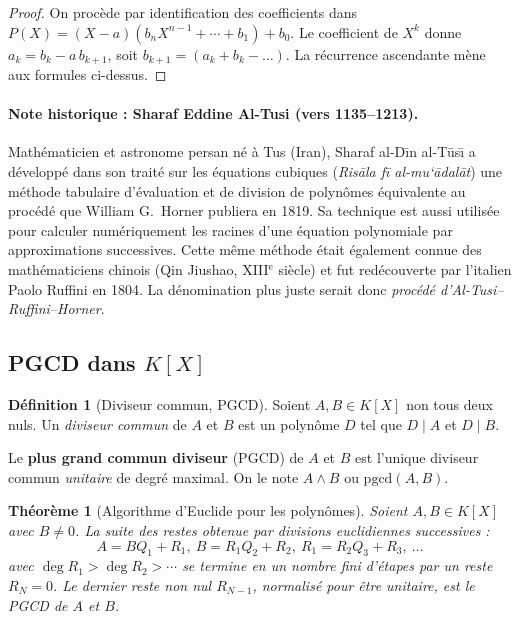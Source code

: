 \documentclass[12pt,a4paper]{report}
\newtheorem{theoreme}{Théorème}[section]
\theoremstyle{definition}
\newtheorem{definition}{Définition}[section]
\theoremstyle{remark}
\begin{document}
\begin{proof}
On procède par identification des coefficients dans $P(X) = (X - a)(b_n X^{n-1} + \cdots + b_1) + b_0$. Le coefficient de $X^k$ donne $a_k = b_k - a\, b_{k+1}$, soit $b_{k+1} = (a_k + b_k - \dots)$. La récurrence ascendante mène aux formules ci-dessus.
\end{proof}

\paragraph{Note historique : Sharaf Eddine Al-Tusi (vers 1135--1213).}
Mathématicien et astronome persan né à Tus (Iran), Sharaf al-D\={\i}n al-T\={u}s\={\i} a développé dans son traité sur les équations cubiques (\emph{Risāla fī al-mu‘ādalāt}) une méthode tabulaire d'évaluation et de division de polynômes équivalente au procédé que William G.\ Horner publiera en 1819. Sa technique est aussi utilisée pour calculer numériquement les racines d'une équation polynomiale par approximations successives. Cette même méthode était également connue des mathématiciens chinois (Qin Jiushao, XIII$^{\text{e}}$ siècle) et fut redécouverte par l'italien Paolo Ruffini en 1804. La dénomination plus juste serait donc \emph{procédé d'Al-Tusi--Ruffini--Horner}.

\subsection{PGCD dans $K[X]$}

\begin{definition}[Diviseur commun, PGCD]
Soient $A, B \in K[X]$ non tous deux nuls. Un \emph{diviseur commun} de $A$ et $B$ est un polynôme $D$ tel que $D \mid A$ et $D \mid B$.

Le \textbf{plus grand commun diviseur} (PGCD) de $A$ et $B$ est l'unique diviseur commun \emph{unitaire} de degré maximal. On le note $A \wedge B$ ou $\mathrm{pgcd}(A, B)$.
\end{definition}

\begin{theoreme}[Algorithme d'Euclide pour les polynômes]
Soient $A, B \in K[X]$ avec $B \neq 0$. La suite des restes obtenue par divisions euclidiennes successives :
\[ A = B Q_1 + R_1,\ B = R_1 Q_2 + R_2,\ R_1 = R_2 Q_3 + R_3,\ \dots \]
avec $\deg R_1 > \deg R_2 > \cdots$ se termine en un nombre fini d'étapes par un reste $R_N = 0$. Le dernier reste non nul $R_{N-1}$, normalisé pour être unitaire, est le PGCD de $A$ et $B$.
\end{theoreme}
\end{document}
